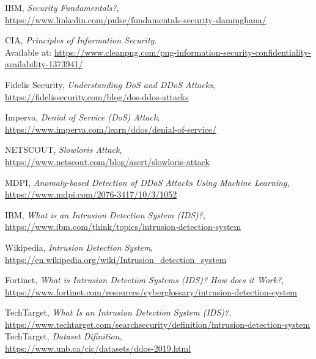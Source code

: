 \documentclass{report}
\begin{document}



\begin{thebibliography}{9}



IBM, \emph{Security Fundamentals?},\\
\url{https://www.linkedin.com/pulse/fundamentals-security-slammghana/}

CIA, \emph{Principles of Information Security}.\\
Available at: \url{https://www.cleanpng.com/png-information-security-confidentiality-availability-1373941/}


Fidelis Security, \emph{Understanding DoS and DDoS Attacks},\\
\url{https://fidelissecurity.com/blog/dos-ddos-attacks}

Imperva, \emph{Denial of Service (DoS) Attack},\\
\url{https://www.imperva.com/learn/ddos/denial-of-service/}

NETSCOUT, \emph{Slowloris Attack},\\
\url{https://www.netscout.com/blog/asert/slowloris-attack}

MDPI, \emph{Anomaly-based Detection of DDoS Attacks Using Machine Learning},\\
\url{https://www.mdpi.com/2076-3417/10/3/1052}

IBM, \emph{What is an Intrusion Detection System (IDS)?},\\
\url{https://www.ibm.com/think/topics/intrusion-detection-system}

Wikipedia, \emph{Intrusion Detection System},\\
\url{https://en.wikipedia.org/wiki/Intrusion_detection_system}

Fortinet, \emph{What is Intrusion Detection Systems (IDS)? How does it Work?},\\
\url{https://www.fortinet.com/resources/cyberglossary/intrusion-detection-system}

TechTarget, \emph{What Is an Intrusion Detection System (IDS)?},\\
\url{https://www.techtarget.com/searchsecurity/definition/intrusion-detection-system}
TechTarget, \emph{Dataset Difinition},\\
\url{https://www.unb.ca/cic/datasets/ddos-2019.html}



\end{thebibliography}
\end{document}
